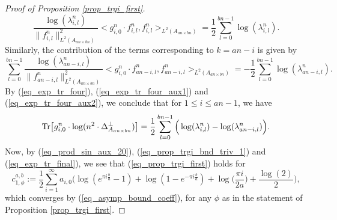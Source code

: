 \documentclass[12pt]{article}
\numberwithin{equation}{section}
\theoremstyle{theorem}
\theoremstyle{definition}
\theoremstyle{remark}
\newcommand{\laplcomp}{\Delta}
\newcommand{\tr}[1]{{\rm{Tr}} \big[ #1 \big]}
\newcommand{\scal}[2]{\big< #1, #2 \big>}
\begin{document}
\begin{proof}[Proof of Proposition \ref{prop_trgi_first}]
\begin{equation}
				\frac{\log(\lambda_{i, l}^{n})}{\| f^{n}_{i, l} \|_{L^2(A_{an \times bn})}^{2}}
				\scal{g^{n}_{i, 0} \cdot f^{n}_{i, l}}{f^{n}_{i, l}}_{L^2(A_{an \times bn})}
				=
				\frac{1}{2}
				\sum_{l = 0}^{bn - 1} 
				\log(\lambda_{i, l}^{n}).
			\end{equation}
			Similarly, the  contribution of the terms corresponding to  $k = an - i$ is given by
			\begin{equation}\label{eq_exp_tr_four_aux2}
				\sum_{l = 0}^{bn - 1} 
				\frac{\log(\lambda_{an-i, l}^{n})}{\| f^{n}_{an-i, l} \|_{L^2(A_{an \times bn})}^{2}}
				\scal{g^{n}_{i, 0} \cdot f^{n}_{an-i, l}}{f^{n}_{an-i, l}}_{L^2(A_{an \times bn})}
				=
				-
				\frac{1}{2}
				\sum_{l = 0}^{bn - 1} 
				\log(\lambda_{an-i, l}^{n}).
			\end{equation}
			By (\ref{eq_exp_tr_four}), (\ref{eq_exp_tr_four_aux1}) and (\ref{eq_exp_tr_four_aux2}), we conclude that for $1 \leq i \leq an - 1$, we have 
			\begin{equation}\label{eq_exp_tr_final}
				\tr{g_{i, 0}^{n} \cdot \log (n^2 \cdot \laplcomp_{A_{an \times bn}}^{\perp})}
				=
				\frac{1}{2}
				\sum_{l = 0}^{bn - 1} 
				\Big( 
				\log(\lambda_{i, l}^{n})
				-
				\log(\lambda_{an-i, l}^{n})
				\Big).
			\end{equation}
			Now, by (\ref{eq_prod_sin_aux_20}), (\ref{eq_prop_trgi_bnd_triv_1}) and (\ref{eq_exp_tr_final}), we see that (\ref{eq_prop_trgi_first}) holds for
			\begin{equation}
				c_{1, \phi}^{a, b} := 
				\frac{1}{2}
				\sum_{i = 1}^{\infty} 
				a_{i, 0} 
				\Big(
					\log(e^{\pi i \frac{b}{a}} - 1)
					+
					\log(1 - e^{- \pi i \frac{b}{a}})
					+
					\log
					\Big(
						\frac{\pi i}{2a}
					\Big)
					+
					\frac{\log(2)}{2}
				\Big),
			\end{equation}
			which converges by (\ref{eq_asymp_bound_coeff}), for any $\phi$ as in the statement of Proposition \ref{prop_trgi_first}.
		\end{proof}
\end{document}
